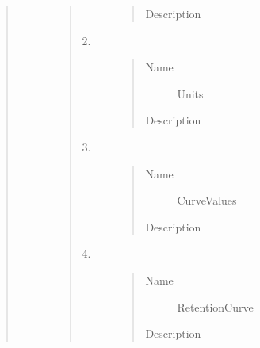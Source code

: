 \documentclass[letterpaper,10pt,english]{sphinxmanual}
\begin{document}
\begin{quote}
\begin{description}
\begin{quote}
\begin{description}
\begin{quote}
\begin{description}
\item[{Description}] \leavevmode
{}

\end{description}\end{quote}

\item[{2.}] \leavevmode\begin{quote}\begin{description}
\item[{Name}] \leavevmode
Units

\item[{Description}] \leavevmode
{}

\end{description}\end{quote}

\item[{3.}] \leavevmode\begin{quote}\begin{description}
\item[{Name}] \leavevmode
CurveValues

\item[{Description}] \leavevmode
{}

\end{description}\end{quote}

\item[{4.}] \leavevmode\begin{quote}\begin{description}
\item[{Name}] \leavevmode
RetentionCurve

\item[{Description}] \leavevmode
{}

\end{description}\end{quote}

\end{description}\end{quote}

\end{description}\end{quote}
\end{document}
